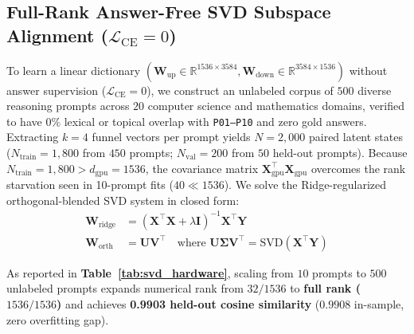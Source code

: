 \documentclass[10pt,twocolumn]{article}
\begin{document}
\subsection{Full-Rank Answer-Free SVD Subspace Alignment ($\mathcal{L}_{\text{CE}} = 0$)}
To learn a linear dictionary $(\mathbf{W}_{\text{up}} \in \mathbb{R}^{1536 \times 3584}, \mathbf{W}_{\text{down}} \in \mathbb{R}^{3584 \times 1536})$ without answer supervision ($\mathcal{L}_{\text{CE}} = 0$), we construct an unlabeled corpus of $500$ diverse reasoning prompts across $20$ computer science and mathematics domains, verified to have $0\%$ lexical or topical overlap with \texttt{P01--P10} and zero gold answers. Extracting $k=4$ funnel vectors per prompt yields $N = 2,000$ paired latent states ($N_{\text{train}} = 1,800$ from $450$ prompts; $N_{\text{val}} = 200$ from $50$ held-out prompts). Because $N_{\text{train}} = 1,800 > d_{\text{gpu}} = 1536$, the covariance matrix $\mathbf{X}_{\text{gpu}}^\top \mathbf{X}_{\text{gpu}}$ overcomes the rank starvation seen in 10-prompt fits ($40 \ll 1536$). We solve the Ridge-regularized orthogonal-blended SVD system in closed form:
\begin{align}
    \mathbf{W}_{\text{ridge}} &= \left(\mathbf{X}^\top \mathbf{X} + \lambda \mathbf{I}\right)^{-1} \mathbf{X}^\top \mathbf{Y} \\
    \mathbf{W}_{\text{orth}} &= \mathbf{U} \mathbf{V}^\top \quad \text{where } \mathbf{U}\boldsymbol{\Sigma}\mathbf{V}^\top = \text{SVD}(\mathbf{X}^\top \mathbf{Y})
\end{align}

As reported in \textbf{Table~\ref{tab:svd_hardware}}, scaling from $10$ prompts to $500$ unlabeled prompts expands numerical rank from $32/1536$ to \textbf{full rank ($1536/1536$)} and achieves \textbf{0.9903 held-out cosine similarity} ($0.9908$ in-sample, zero overfitting gap).
\end{document}
